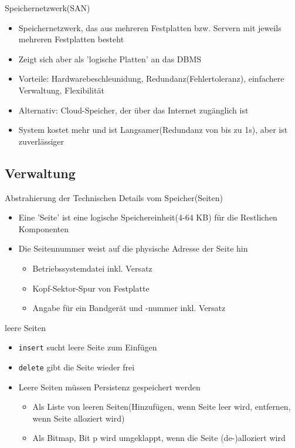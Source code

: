 \documentclass{article}
\begin{document}
\begin{block}{Speichernetzwerk(SAN)}
  \begin{itemize}
    \item Speichernetzwerk, das aus mehreren Festplatten bzw. Servern mit jeweils mehreren Festplatten besteht
    \item Zeigt sich aber als 'logische Platten' an das DBMS
    \item Vorteile: Hardwarebeschleunidung, Redundanz(Fehlertoleranz), einfachere Verwaltung, Flexibilität
    \item Alternativ: Cloud-Speicher, der über das Internet zugänglich ist
    \item System kostet mehr und ist Langsamer(Redundanz von bis zu 1s), aber ist zuverlässiger
  \end{itemize}
\end{block}

\subsection*{Verwaltung}

\begin{block}{Abstrahierung der Technischen Details vom Speicher(Seiten)}
  \begin{itemize}
    \item Eine 'Seite' ist eine logische Speichereinheit(4-64 KB) für die Restlichen Komponenten
    \item Die Seitennummer weist auf die physische Adresse der Seite hin
    \begin{itemize}
      \item Betriebssystemdatei inkl. Versatz
      \item Kopf-Sektor-Spur von Festplatte
      \item Angabe für ein Bandgerät und -nummer inkl. Versatz
    \end{itemize}
  \end{itemize}
\end{block}

\begin{block}{leere Seiten}
  \begin{itemize}
    \item \texttt{insert} sucht leere Seite zum Einfügen
    \item \texttt{delete} gibt die Seite wieder frei
    \item Leere Seiten müssen Persistenz gespeichert werden
    \begin{itemize}
      \item Als Liste von leeren Seiten(Hinzufügen, wenn Seite leer wird, entfernen, wenn Seite alloziert wird)
      \item Als Bitmap, Bit p wird umgeklappt, wenn die Seite (de-)alloziert wird
    \end{itemize}
  \end{itemize}
\end{block}
\end{document}
